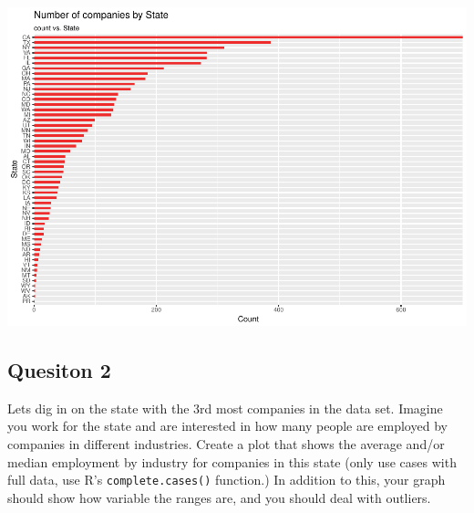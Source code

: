 \documentclass[]{article}
\newenvironment{Shaded}{\begin{snugshade}}{\end{snugshade}}
\newcommand{\KeywordTok}[1]{\textcolor[rgb]{0.13,0.29,0.53}{\textbf{#1}}}
\newcommand{\DataTypeTok}[1]{\textcolor[rgb]{0.13,0.29,0.53}{#1}}
\newcommand{\DecValTok}[1]{\textcolor[rgb]{0.00,0.00,0.81}{#1}}
\newcommand{\StringTok}[1]{\textcolor[rgb]{0.31,0.60,0.02}{#1}}
\newcommand{\OperatorTok}[1]{\textcolor[rgb]{0.81,0.36,0.00}{\textbf{#1}}}
\newcommand{\NormalTok}[1]{#1}
\begin{document}
\includegraphics{DATA_608_Project_1_files/figure-latex/unnamed-chunk-5-1.pdf}

\subsection{Quesiton 2}\label{quesiton-2}

Lets dig in on the state with the 3rd most companies in the data set.
Imagine you work for the state and are interested in how many people are
employed by companies in different industries. Create a plot that shows
the average and/or median employment by industry for companies in this
state (only use cases with full data, use R's \texttt{complete.cases()}
function.) In addition to this, your graph should show how variable the
ranges are, and you should deal with outliers.

\begin{Shaded}
\end{Shaded}
\end{document}
